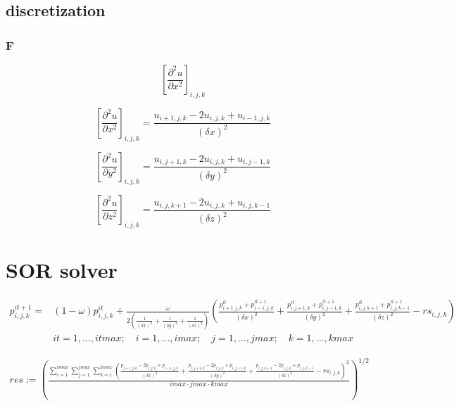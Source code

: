 \documentclass[10pt]{article}
\begin{document}
\subsection{discretization}
\subsubsection{F}

\begin{equation}
\left[\frac{\partial^2 u}{\partial x^2}\right]_{i,j,k}
\end{equation}

\begin{equation}
\left[\frac{\partial^2 u}{\partial x^2}\right]_{i,j,k} =
\frac{u_{i+1,j,k} - 2u_{i,j,k} + u_{i-1,j,k}}{(\delta x)^2}
\end{equation}

\begin{equation}
\left[\frac{\partial^2 u}{\partial y^2}\right]_{i,j,k} =
\frac{u_{i,j+1,k} - 2u_{i,j,k} + u_{i,j-1,k}}{(\delta y)^2}
\end{equation}

\begin{equation}
\left[\frac{\partial^2 u}{\partial z^2}\right]_{i,j,k} =
\frac{u_{i,j,k+1} - 2u_{i,j,k} + u_{i,j,k-1}}{(\delta z)^2}
\end{equation}


\section{SOR solver}
\begin{equation}
\begin{split}
p^{it+1}_{i,j,k} = & (1 - \omega) p^{it}_{i,j,k} + \frac{\omega}{2 (\frac{1}{(\delta x)^2} + \frac{1}{(\delta y)^2} + \frac{1}{(\delta z)^2})} \left( \frac{p^{it}_{i+1,j,k} + p^{it+1}_{i-1,j,k}}{(\delta x)^2} + \frac{p^{it}_{i,j+1,k} + p^{it+1}_{i,j-1,k}}{(\delta y)^2} + \frac{p^{it}_{i,j,k+1} + p^{it+1}_{i,j,k-1}}{(\delta z)^2} - rs_{i,j,k} \right)\\
& it = 1,\ldots,itmax; \quad i = 1,\ldots,imax; \quad j = 1,\ldots,jmax; \quad k = 1,\ldots,kmax
\end{split}
\end{equation}

\begin{equation}
\begin{split}
res := \left( \frac{\sum_{i=1}^{imax} \sum_{j=1}^{jmax} \sum_{k=1}^{kmax} \left( \frac{p_{i+1,j,k} - 2 p_{i,j,k} + p_{i-1,j,k}}{(\delta x)^2} + \frac{p_{i,j+1,k} - 2 p_{i,j,k} + p_{i,j-1,k}}{(\delta y)^2} + \frac{p_{i,j,k+1} - 2 p_{i,j,k} + p_{i,j,k-1}}{(\delta z)^2} - rs_{i,j,k} \right)^2}{imax \cdot jmax \cdot kmax} \right)^{1/2}\\
\end{split}
\end{equation}
\end{document}
